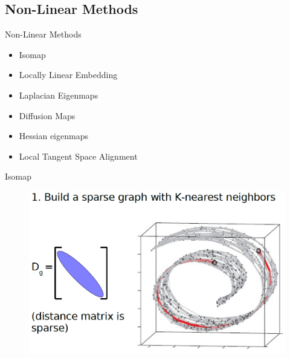 \documentclass{beamer}
\theoremstyle{plain}
\theoremstyle{definition}
\theoremstyle{plain}
\theoremstyle{plain}
\begin{document}
\subsection{Non-Linear Methods}
\begin{frame}{Non-Linear Methods}
\begin{itemize}
\item Isomap
\item Locally Linear Embedding
\item Laplacian Eigenmaps
\item Diffusion Maps
\item Hessian eigenmaps
\item Local Tangent Space Alignment
\end{itemize}

\end{frame}
\begin{frame}{Isomap}
\begin{figure}[ht]
\begin{center}
\includegraphics[width=\textwidth]{./figures/ISO_1.png}
\end{center}
\end{figure}
\end{frame}
\end{document}
